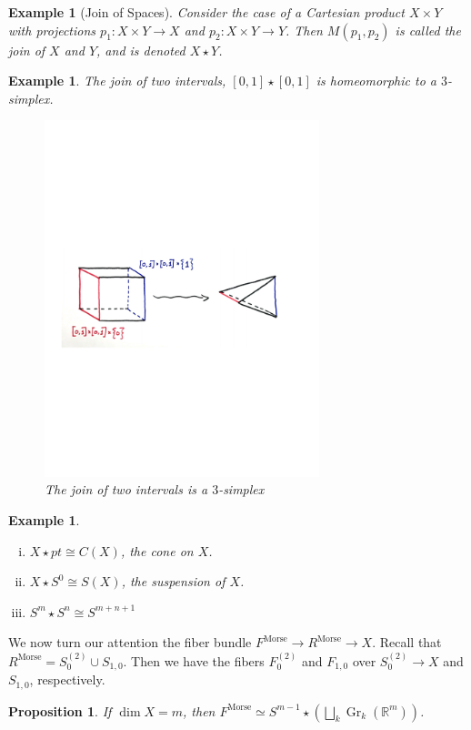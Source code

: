 \documentclass{article}
\newtheorem{proposition}[theorem]{Proposition}
\newtheorem{example}[theorem]{Example}
\newtheorem{proposed work}[theorem]{Proposed Work}
\DeclareMathOperator{\Morse}{Morse}
\DeclareMathOperator{\Gr}{Gr}
\begin{document}
\begin{example}[Join of Spaces]
Consider the case of a Cartesian product $X \times Y$ with projections $p_1: X \times Y \to X$ and $p_2: X \times Y \to Y$. Then $M(p_1, p_2)$ is called the \emph{join} of $X$ and $Y$, and is denoted $X \star Y$. 
\end{example}

\begin{example}
The join of two intervals, $[0,1] \star [0,1]$ is homeomorphic to a $3$-simplex. 
\begin{figure}[h]
\centering
\includegraphics[width=8cm]{joinint}
\caption{The join of two intervals is a $3$-simplex}
\end{figure}
\end{example}

\begin{example}
\begin{enumerate}[(i)]
\item $X \star pt \cong C(X)$, the cone on $X$.
\item $X \star S^0 \cong S(X)$, the suspension of $X$.
\item $S^m \star S^n \cong S^{m+n+1}$
\end{enumerate}
\end{example} 

We now turn our attention the fiber bundle $F^{\Morse} \to R^{\Morse} \to X$. Recall that $R^{\Morse} = S_0^{(2)} \cup S_{1,0}$. Then we have the fibers $F_0^{(2)}$ and $F_{1,0}$ over $S_0^{(2)} \to X$ and $S_{1,0}$, respectively.

\begin{proposition}
If $\dim X = m$, then $F^{\Morse} \simeq S^{m-1} \star \left( \bigsqcup_k \Gr_k(\mathbb{R}^m) \right)$.
\end{proposition}
\end{document}
